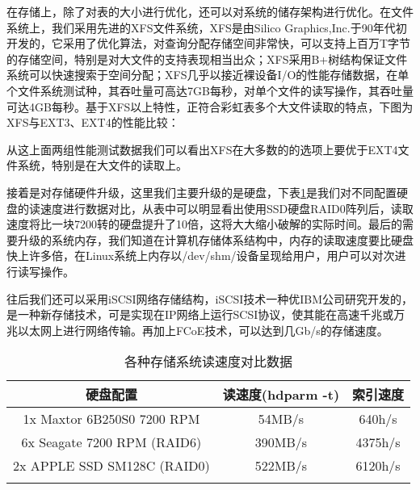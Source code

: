 在存储上，除了对表的大小进行优化，还可以对系统的储存架构进行优化。在文件系统上，我们采用先进的XFS文件系统，XFS是由Silico Graphics,Inc.于90年代初开发的，它采用了优化算法，对查询分配存储空间非常快，可以支持上百万T字节的存储空间，特别是对大文件的支持表现相当出众；XFS采用B+树结构保证文件系统可以快速搜索于空间分配；XFS几乎以接近裸设备I/O的性能存储数据，在单个文件系统测试种，其吞吐量可高达7GB每秒，对单个文件的读写操作，其吞吐量可达4GB每秒。基于XFS以上特性，正符合彩虹表多个大文件读取的特点，下图为XFS与EXT3、EXT4的性能比较：
\begin{figure}[!h]
\begin{floatrow}
\end{floatrow}
\end{figure}

从这上面两组性能测试数据我们可以看出XFS在大多数的的选项上要优于EXT4文件系统，特别是在大文件的读取上。

接着是对存储硬件升级，这里我们主要升级的是硬盘，下表\ref{tab:5.1}是我们对不同配置硬盘的读速度进行数据对比，从表中可以明显看出使用SSD硬盘RAID0阵列后，读取速度将比一块7200转的硬盘提升了10倍，这将大大缩小破解的实际时间。最后的需要升级的系统内存，我们知道在计算机存储体系结构中，内存的读取速度要比硬盘快上许多倍，在Linux系统上内存以/dev/shm/设备呈现给用户，用户可以对次进行读写操作。

往后我们还可以采用iSCSI网络存储结构，iSCSI技术一种优IBM公司研究开发的，是一种新存储技术，可是实现在IP网络上运行SCSI协议，使其能在高速千兆或万兆以太网上进行网络传输。再加上FCoE技术，可以达到几Gb/s的存储速度。
\begin{longtable}{@{\extracolsep{\fill}}ccc}
\caption{各种存储系统读速度对比数据}\\\toprule[1pt]
\multicolumn{1}{c}{硬盘配置} & 
\multicolumn{1}{c}{读速度(hdparm -t)} &
\multicolumn{1}{c}{索引速度} \\\midrule
1x Maxtor 6B250S0 7200 RPM & 54MB/s & 640h/s \\
6x Seagate 7200 RPM (RAID6) & 390MB/s & 4375h/s \\
2x APPLE SSD SM128C (RAID0) & 522MB/s & 6120h/s \\
\bottomrule[1pt]
\label{tab:5.1}
\end{longtable}


